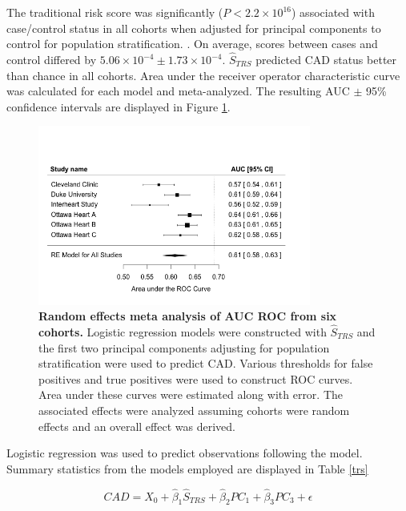The traditional risk score was significantly ($P < 2.2 \times 10^{16}$) associated with case/control status in all cohorts when adjusted for principal components to control for population stratification. \citep{Price2006,Zhang2013}. On average, scores between cases and control differed by $5.06 \times 10^{-4} \pm 1.73 \times 10^{-4}$. $\hat{S}_{TRS}$ predicted CAD status better than chance in all cohorts. Area under the receiver operator characteristic curve was calculated for each model and meta-analyzed. The resulting AUC $\pm$ 95\% confidence intervals are displayed in Figure \ref{trs_meta}.

\begin{figure}[h]
\label{trs_meta}
\centering
\includegraphics[width=0.8\textwidth]{Figures/trs_meta.png}
\caption[Random effects meta analysis of AUC ROC from six cohorts.]{\textbf{Random effects meta analysis of AUC ROC from six cohorts.} Logistic regression models were constructed with $\hat{S}_{TRS}$ and the first two principal components adjusting for population stratification were used to predict \ac{CAD}. Various thresholds for false positives and true positives were used to construct \ac{ROC} curves. Area under these curves were estimated along with error. The associated effects were analyzed assuming cohorts were random effects and an overall effect was derived.}
\end{figure}

Logistic regression was used to predict observations following the model. Summary statistics from the models employed are displayed in Table \ref{trs}

$$ CAD = X_0 + \hat{\beta}_1 \hat{S}_{TRS} + \hat{\beta}_2 PC_1 + \hat{\beta}_3 PC_3 + \epsilon $$

